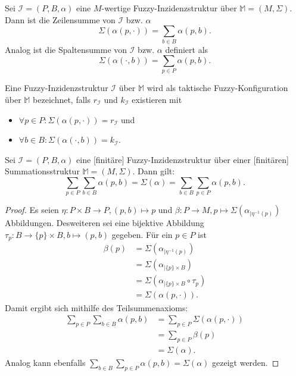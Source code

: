 \documentclass{article}
\begin{document}
\begin{definition}
  Sei $\mathcal{I} = (P, B, \alpha)$ eine $M$-wertige Fuzzy-Inzidenzstruktur über $\mathbb{M} = (M, \Sigma)$.
  Dann ist die Zeilensumme von $\mathcal{I}$ bzw. $\alpha$
  \begin{equation*}
    \Sigma(\alpha(p, \cdot)) = \sum_{b \in B}\alpha(p, b).
  \end{equation*}
  Analog ist die Spaltensumme von $\mathcal{I}$ bzw. $\alpha$ definiert als
  \begin{equation*}
    \Sigma(\alpha(\cdot, b)) = \sum_{p \in P}\alpha(p, b).
  \end{equation*}
\end{definition}

\begin{definition}
  Eine Fuzzy-Inzidenzstruktur $\mathcal{I}$ über $\mathbb{M}$ wird als taktische Fuzzy-Konfiguration über $\mathbb{M}$ bezeichnet,
  falls $r_\mathcal{I}$ und $k_\mathcal{I}$ existieren mit
  \begin{itemize}
    \item $\forall p \in P  \colon \Sigma(\alpha(p, \cdot)) = r_\mathcal{I}$ und
    \item $\forall b \in B  \colon \Sigma(\alpha(\cdot, b)) = k_\mathcal{I}$.
  \end{itemize}
\end{definition}

\begin{theorem}
  Sei  $\mathcal{I} = (P, B, \alpha)$ eine [finitäre] Fuzzy-Inzidenzstruktur über einer [finitären]
  Summationsstruktur $\mathbb{M} = (M, \Sigma)$.
  Dann gilt:
  \begin{equation*}
    \sum_{p \in P}\sum_{b \in B}\alpha(p, b) = \Sigma(\alpha) = \sum_{b \in B}\sum_{p \in P}\alpha(p, b).
  \end{equation*}
\end{theorem}
\begin{proof}
  Es seien $\eta \colon P \times B \to P, (p, b) \mapsto p$ und
  $\beta \colon P \to M, p \mapsto \Sigma(\alpha_{\mid \eta^{-1}(p)})$ Abbildungen.
  Desweiteren sei eine bijektive Abbildung $\tau_p \colon B \to \{p\} \times B, b \mapsto (p, b)$ gegeben.
  Für ein $p \in P$ ist
  \begin{align*}
    \beta(p) &= \Sigma(\alpha_{\mid \eta^{-1}(p)}) \\
    &= \Sigma(\alpha_{\mid \{p\} \times B}) \\
    &= \Sigma(\alpha_{\mid \{p\} \times B} \circ \tau_p) \\
    &= \Sigma(\alpha(p, \cdot)).
  \end{align*}
  Damit ergibt sich mithilfe des Teilsummenaxioms:
  \begin{align*}
    \sum_{p \in P}\sum_{b \in B}\alpha(p, b) &= \sum_{p \in P}\Sigma(\alpha(p, \cdot)) \\
    &= \sum_{p \in P}\beta(p) \\
    &= \Sigma(\alpha).
  \end{align*}
  Analog kann ebenfalls $\sum_{b \in B}\sum_{p \in P}\alpha(p, b) = \Sigma(\alpha)$ gezeigt werden.
\end{proof}
\end{document}
